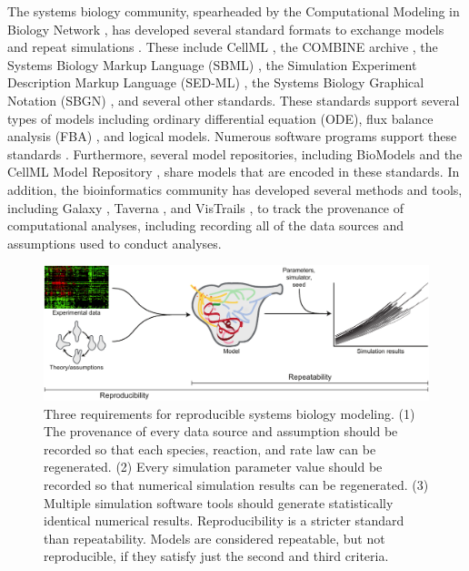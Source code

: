 \documentclass[journal,transmag,twoside]{IEEEtran}
\begin{document}
The systems biology community, spearheaded by the Computational Modeling in Biology Network \cite{hucka2015promoting}, has developed several standard formats to exchange models and repeat simulations \cite{drager2014improving}. These include CellML \cite{cuellar2003overview}, the COMBINE archive \cite{COMBINE2012}, the Systems Biology Markup Language (SBML) \cite{hucka2003}, the Simulation Experiment Description Markup Language (SED-ML) \cite{sedml2011}, the Systems Biology Graphical Notation (SBGN) \cite{LeNovereHMMSS09}, and several other standards. These standards support several types of models including ordinary differential equation (ODE), flux balance analysis (FBA) \cite{orth2010flux}, and logical models. Numerous software programs support these standards \cite{hucka2011profile}. Furthermore, several model repositories, including BioModels \cite{chelliah2015biomodels} and the CellML Model Repository \cite{lloyd2008cellml}, share models that are encoded in these standards. In addition, the bioinformatics community has developed several methods and tools, including Galaxy \cite{hillman2012using}, Taverna \cite{oinn2004taverna}, and VisTrails \cite{callahan2006vistrails}, to track the provenance of computational analyses, including recording all of the data sources and assumptions used to conduct analyses.

\begin{figure}[!tb]
\centering
\includegraphics[width=\textwidth]{figure1/figure1}
\caption{Three requirements for reproducible systems biology modeling. (1) The provenance of every data source and assumption should be recorded so that each species, reaction, and rate law can be regenerated. (2) Every simulation parameter value should be recorded so that numerical simulation results can be regenerated. (3) Multiple simulation software tools should generate statistically identical numerical results. Reproducibility is a stricter standard than repeatability. Models are considered repeatable, but not reproducible, if they satisfy just the second and third criteria.}
\label{fig_repro_diagram}
\end{figure}
\end{document}
